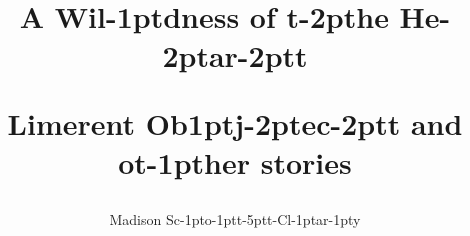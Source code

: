 \title{\Large\TitleFamily A Wil\kern-1ptdness of t\kern-2pthe He\kern-2ptar\kern-2ptt

\vspace{0.25in}

\normalsize Limerent Ob\kern1ptj\kern-2ptec\kern-2ptt and ot\kern-1pther stories\vfill}
\author{\TitleFamily Madison Sc\kern-1pto\kern-1ptt\kern-5ptt-Cl\kern-1ptar\kern-1pty}
\date{}
